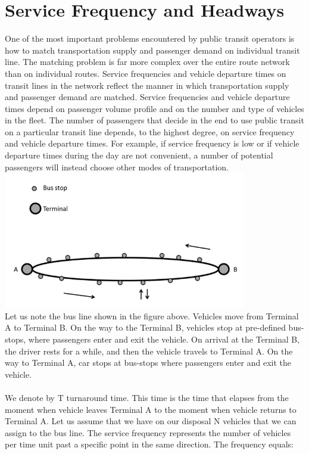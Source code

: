 \section{Service Frequency and Headways}
One of the most important problems encountered by public transit operators is how to match transportation supply and passenger demand on individual transit line. The matching problem is far more complex over the entire route network than on individual routes. Service frequencies and vehicle departure times on transit lines in the network reflect the manner in which transportation supply and passenger demand are matched. Service frequencies and vehicle departure times depend on passenger volume profile and on the number and type of vehicles in the fleet. The number of passengers that decide in the end to use public transit on a particular transit line depends, to the highest degree, on service frequency and vehicle departure times. For example, if service frequency is low or if vehicle departure times during the day are not convenient, a number of potential passengers will instead choose other modes of transportation.\\
\includegraphics{gfx/fig24.png}\\
Let us note the bus line shown in the figure above. Vehicles move from Terminal A to Terminal B. On the way to the Terminal B, vehicles stop at pre-defined bus-stops, where passengers enter and exit the vehicle. On arrival at the Terminal B, the driver rests for a while, and then the vehicle travels to Terminal A. On the way to Terminal A, car stops at bus-stops where passengers enter and exit the vehicle.\\\\
We denote by T turnaround time. This time is the time that elapses from the moment when vehicle leaves Terminal A to the moment when vehicle returns to Terminal A. Let us assume that we have on our disposal N vehicles that we can assign to the bus line. The service frequency represents the number of vehicles per time unit past a specific point in the same direction. The frequency equals:
